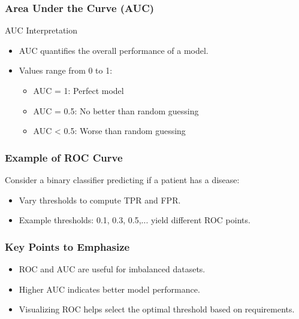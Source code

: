 \documentclass[aspectratio=169]{beamer}
\begin{document}
\begin{frame}[fragile]
    \frametitle{Area Under the Curve (AUC)}
    \begin{block}{AUC Interpretation}
        \begin{itemize}
            \item AUC quantifies the overall performance of a model.
            \item Values range from 0 to 1:
            \begin{itemize}
                \item AUC = 1: Perfect model
                \item AUC = 0.5: No better than random guessing
                \item AUC < 0.5: Worse than random guessing
            \end{itemize}
        \end{itemize}
    \end{block}
\end{frame}

\begin{frame}[fragile]
    \frametitle{Example of ROC Curve}
    Consider a binary classifier predicting if a patient has a disease:
    \begin{itemize}
        \item Vary thresholds to compute TPR and FPR.
        \item Example thresholds: 0.1, 0.3, 0.5,... yield different ROC points.
    \end{itemize}
\end{frame}

\begin{frame}[fragile]
    \frametitle{Key Points to Emphasize}
    \begin{itemize}
        \item ROC and AUC are useful for imbalanced datasets.
        \item Higher AUC indicates better model performance.
        \item Visualizing ROC helps select the optimal threshold based on requirements.
    \end{itemize}
\end{frame}
\end{document}
